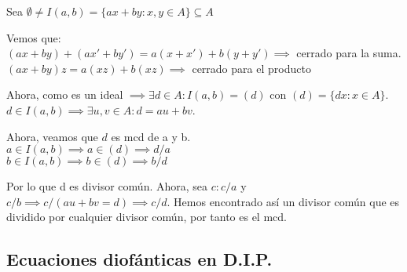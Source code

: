 \documentclass[11pt, a4paper, titlepage]{article}
\makeatletter
\renewenvironment{proof}[1][\proofname] {\vspace{-15pt}\par\pushQED{\qed}\normalfont\topsep6\p@\@plus6\p@\relax\trivlist\item[\hskip\labelsep\it#1\@addpunct{.}]\ignorespaces}{\popQED\endtrivlist\@endpefalse}
\theoremstyle{theorem-style}
\theoremstyle{definition-style}
\theoremstyle{remark-style}
\theoremstyle{example-style}
\makeatother
\begin{document}
\begin{proof}
	Sea $\emptyset \ne I(a,b) = \{ax + by : x,y \in A\} \subseteq A$
	
	Vemos que:\\
$(ax+by)+(ax'+by') = a(x+x') + b(y+y') \implies$ cerrado para la suma.\\
$(ax+by)z = a(xz)+b(xz)\implies$ cerrado para el producto

Ahora, como es un ideal $\implies \exists d\in A : I(a,b) = (d)$ con $(d)=\{dx: x \in A\}$.
$d\in I(a,b) \implies \exists u,v \in A : d=au+bv$.

Ahora, veamos que $d$ es mcd de a y b.\\
$a\in I(a,b) \implies a \in (d) \implies d/a$\\
$b\in I(a,b) \implies b \in (d) \implies b/d$

Por lo que d es divisor común. Ahora, sea $c: c/a$ y $c/b \implies c/(au+bv=d) \implies c/d$.
Hemos encontrado así un divisor común que es dividido por cualquier divisor común, por tanto es el mcd. 
\end{proof}

\subsection{Ecuaciones diofánticas en D.I.P.}
\end{document}
